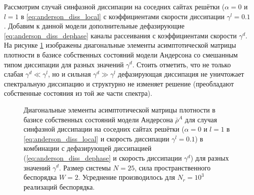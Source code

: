 Рассмотрим случай синфазной диссипации на соседних сайтах решётки (\(\alpha=0\) и \(l=1\) в \cref{eq:anderson_diss_local} с коэффициентами скорости диссипации \(\gamma^l = 0.1\). Добавим к данной модели дополнительные дефазирующие \cref{eq:anderson_diss_dephase} каналы рассеивания с коэффициентами скорости \(\gamma^d\). На рисунке \cref{fig:anderson_rho_nn_with_dephasing} изображены диагональные элементы асимптотической матрицы плотности в базисе собственных состояний модели Андерсона со смешанным типом диссипации для разных значений \(\gamma^d\). Стоить отметить, что не только слабая \(\gamma^d \ll \gamma^l\), но и сильная \(\gamma^d \gg \gamma^l\) дефазирующая диссипация не уничтожает спектральную диссипацию и структурно не изменяет решение (преобладают собственные состояния из той же части спектра).

\begin{figure}[ht]
	\caption{
		Диагональные элементы асимптотической матрицы плотности в базисе собственных состояний модели Андерсона \(\bar{\rho}^A\) для случая синфазной диссипации на соседних сайтах решётки (\(\alpha=0\) и \(l=1\) в \cref{eq:anderson_diss_local} и скорость диссипации \(\gamma^l=0.1\)) в комбинации с дефазирующей диссипацией (\cref{eq:anderson_diss_dephase} и скорость диссипации \(\gamma^d\)) для разных значений \(\gamma^d\). Размер системы \(N=25\), сила пространственного беспорядка \(W=2\). Усреднение производилось для \(N_r = 10^3\) реализаций беспорядка. 
	}
	\label{fig:anderson_rho_nn_with_dephasing}
\end{figure}

